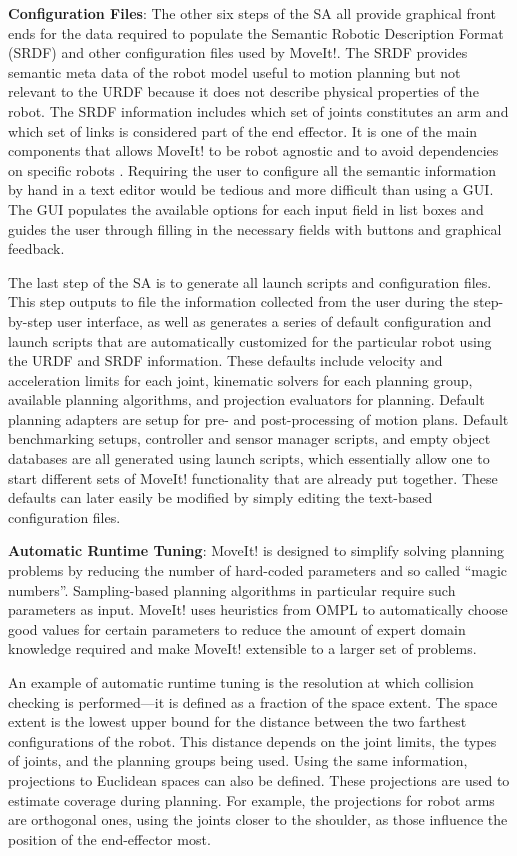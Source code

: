 \documentclass[10pt,journal,compsoc]{joser1}
\begin{document}
{{\bf Configuration Files}: The other six steps of the SA all provide graphical front ends for the data required to populate the Semantic Robotic Description Format (SRDF) and other configuration files used by MoveIt!. The SRDF provides semantic meta data of the robot model useful to motion planning but not relevant to the URDF because it does not describe physical properties of the robot. The SRDF information includes which set of joints constitutes an arm and which set of links is considered part of the end effector. It is one of the main components that allows MoveIt! to be robot agnostic and to avoid dependencies on specific robots \cite{moveit}. Requiring the user to configure all the semantic information by hand in a text editor would be tedious and more difficult than using a GUI. The GUI populates the available options for each input field in list boxes and guides the user through filling in the necessary fields with buttons and graphical feedback.

The last step of the SA is to generate all launch scripts and configuration files. This step outputs to file the information collected from the user during the step-by-step user interface, as well as generates a series of default configuration and launch scripts that are automatically customized for the particular robot using the URDF and SRDF information. These defaults include velocity and acceleration limits for each joint, kinematic solvers for each planning group, available planning algorithms, and projection evaluators for planning. Default planning adapters are setup for pre- and post-processing of motion plans. Default benchmarking setups, controller and sensor manager scripts, and empty object databases are all generated using launch scripts, which essentially allow one to start different sets of MoveIt! functionality that are already put together. These defaults can later 
easily be modified by simply editing the text-based configuration files.

{\bf Automatic Runtime Tuning}: MoveIt! is designed to simplify solving planning problems by reducing the number of hard-coded parameters and so called ``magic numbers''. Sampling-based planning algorithms in particular require such parameters as input. MoveIt! uses heuristics from OMPL to automatically choose good values for certain parameters to reduce the amount of expert domain knowledge required and make MoveIt! extensible to a larger set of problems. 

An example of automatic runtime tuning is the resolution at which collision checking is performed---it is defined as a fraction of the space extent. The space extent is the lowest upper bound for the distance between the two farthest configurations of the robot. This distance depends on the joint limits, the types of joints, and the planning groups being used. Using the same information, projections to Euclidean spaces can also be defined. These projections are used to estimate coverage during planning. For example, the projections for robot arms are orthogonal ones, using the joints closer to the shoulder, as those influence the position of the end-effector most.  

}
\end{document}
